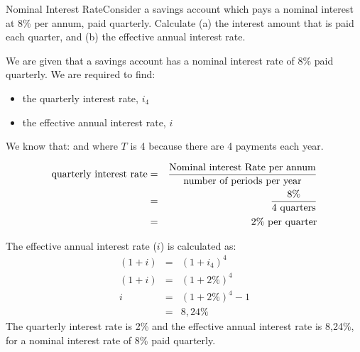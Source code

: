 \begin{wex}{Nominal Interest Rate}{Consider a savings account which pays a nominal interest at 8\% per annum, paid quarterly. Calculate (a) the interest amount that is paid each quarter, and (b) the effective annual interest rate.}
{
We are given that a savings account has a nominal interest rate of 8\% paid quarterly. We are required to find:
\begin{itemize}
\item{the quarterly interest rate, $i_4$}
\item{the effective annual interest rate, $i$}
\end{itemize}

We know that:
and
where $T$ is 4 because there are 4 payments each year.

\begin{eqnarray*}
\mbox{quarterly interest rate}&=&\frac{\mbox{Nominal interest Rate per annum}}{\mbox{number of periods per year}}\\
&=& \frac{8\%}{4~\rm{quarters}}\\
&=& 2\%~\mbox{per quarter}
\end{eqnarray*}

The effective annual interest rate ($i$) is calculated as:
\begin{eqnarray*}
(1 + i) &=& (1 + i_4)^{4}\\
(1+ i) &=& (1+ 2\%)^4\\
i &=& (1+ 2\%)^4 - 1\\
&=&8,24\%
\end{eqnarray*}
The quarterly interest rate is 2\% and the effective annual interest rate is 8,24\%, for a nominal interest rate of 8\% paid quarterly.}
\end{wex}

